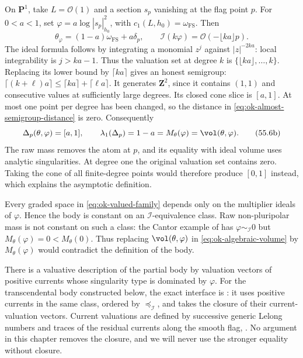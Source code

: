 \begin{example}
\label{ex:ok-p1-partial-interval}
On $\mathbf P^1$, take $L=\mathcal O(1)$ and a section $s_p$ vanishing
at the flag point $p$.  For $0<a<1$, set
$\varphi=a\log|s_p|_{h_0}^2$, with $c_1(L,h_0)=\omega_{\mathrm{FS}}$.
Then
\[
 \theta_\varphi=(1-a)\omega_{\mathrm{FS}}+a\delta_p,
 \qquad \mathcal I(k\varphi)=\mathcal O(-\lfloor ka\rfloor p).
\tag{55.6a}\label{eq:ok-p1-pole-ideals}
\]
The ideal formula follows by integrating a monomial $z^j$ against
$|z|^{-2ka}$: local integrability is $j>ka-1$.
Thus the valuation set at degree $k$ is
$\{\lfloor ka\rfloor,\ldots,k\}$.
Replacing its lower bound by $\lceil ka\rceil$ gives an honest semigroup:
$\lceil(k+\ell)a\rceil\leq\lceil ka\rceil+\lceil\ell a\rceil$.
It generates $\mathbf Z^2$, since it contains $(1,1)$ and consecutive
values at sufficiently large degrees.  Its closed cone slice is $[a,1]$.
At most one point per degree has been changed, so the distance in
\eqref{eq:ok-almost-semigroup-distance} is zero.  Consequently
\[
 \Delta_p(\theta,\varphi)=[a,1],\qquad
 \lambda_1(\Delta_p)=1-a=M_\theta(\varphi)=\vol(\theta,\varphi).
\tag{55.6b}\label{eq:ok-p1-partial-body}
\]
The raw mass removes the atom at $p$, and its equality with ideal volume
uses analytic singularities.  At degree one the original valuation set
contains zero.  Taking the cone of all finite-degree points would therefore
produce $[0,1]$ instead, which explains the asymptotic definition.
\end{example}

\begin{remark}
\label{rem:ok-ideal-volume-necessity}
Every graded space in \eqref{eq:ok-valued-family} depends only on the
multiplier ideals of $\varphi$.  Hence the body is constant on an
$\mathcal I$-equivalence class.  Raw non-pluripolar mass is not constant
on such a class: the Cantor example of
 has
$\varphi\sim_{\mathcal I}0$ but
$M_\theta(\varphi)=0<M_\theta(0)$.  Thus replacing
$\vol(\theta,\varphi)$ in \eqref{eq:ok-algebraic-volume} by
$M_\theta(\varphi)$ would contradict the definition of the body.
\end{remark}

\begin{remark}
\label{rem:ok-valuative-closure}
There is a valuative description of the partial body by valuation vectors of
positive currents whose singularity type is dominated by
$\varphi$.
For the transcendental body constructed below, the exact interface is
\cite[Theorem~10.4.4]{XiaBook}: it uses positive currents in the same class,
ordered by $\preceq_{\mathcal I}$, and takes the closure of their
current-valuation vectors.  Current valuations are defined by successive
generic Lelong numbers and traces of the residual currents along the
smooth flag, \cite[Definition~10.2.3]{XiaBook}.
No argument in this chapter removes the closure, and we will never use the
stronger equality without closure.
\end{remark}

